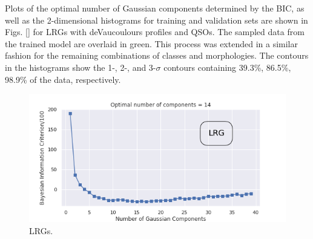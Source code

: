Plots of the optimal number of Gaussian components determined by the BIC, as well as the 2-dimensional histograms for training and validation sets are shown in Figs. \ref{} for LRGs with deVaucoulours profiles and QSOs. The sampled data from the trained model are overlaid in green. This process was extended in a similar fashion for the remaining combinations of classes and morphologies. The contours in the histograms show the 1-, 2-, and 3-$\sigma$ contours containing 39.3\%, 86.5\%, 98.9\% of the data, respectively. 


\begin{figure}
  \centering
  \includegraphics[width=\textwidth]{images/gmm/lrgDev_bic.png}
  \caption{LRGs.}
  \label{fig:lrg_bic}
\end{figure}

